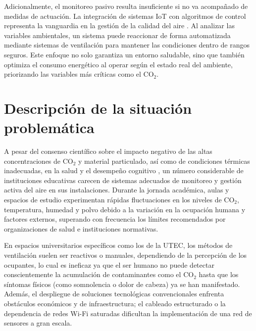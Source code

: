 Adicionalmente, el monitoreo pasivo resulta insuficiente si no va acompañado de medidas de actuación. La integración de sistemas IoT con algoritmos de control representa la vanguardia en la gestión de la calidad del aire \cite{predictive_ventilation_iot_2023}. Al analizar las variables ambientales, un sistema puede reaccionar de forma automatizada mediante sistemas de ventilación para mantener las condiciones dentro de rangos seguros. Este enfoque no solo garantiza un entorno saludable, sino que también optimiza el consumo energético al operar según el estado real del ambiente, priorizando las variables más críticas como el CO\(_2\).























\section{Descripción de la situación problemática}

A pesar del consenso científico sobre el impacto negativo de las altas concentraciones de CO\(_2\) y material particulado, así como de condiciones térmicas inadecuadas, en la salud y el desempeño cognitivo \cite{effects_of_low_level_inhalation_exposure_to_carbon_dioxide_in_indoor_environments_a_short_review_on_human_health_and_psychomotor_performance}, un número considerable de instituciones educativas carecen de sistemas adecuados de monitoreo y gestión activa del aire en sus instalaciones. Durante la jornada académica, aulas y espacios de estudio experimentan rápidas fluctuaciones en los niveles de CO\(_2\), temperatura, humedad y polvo debido a la variación en la ocupación humana y factores externos, superando con frecuencia los límites recomendados por organizaciones de salud e instituciones normativas.

En espacios universitarios específicos como los de la UTEC, los métodos de ventilación suelen ser reactivos o manuales, dependiendo de la percepción de los ocupantes, lo cual es ineficaz ya que el ser humano no puede detectar conscientemente la acumulación de contaminantes como el CO\(_2\) hasta que los síntomas físicos (como somnolencia o dolor de cabeza) ya se han manifestado. Además, el despliegue de soluciones tecnológicas convencionales enfrenta obstáculos económicos y de infraestructura; el cableado estructurado o la dependencia de redes Wi-Fi saturadas dificultan la implementación de una red de sensores a gran escala.

